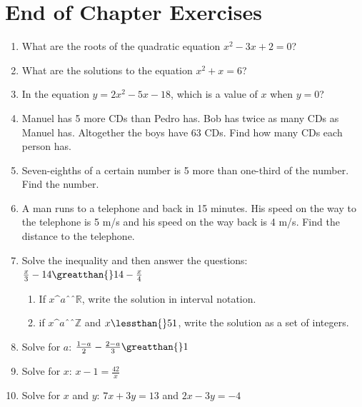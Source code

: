             \section{ End of Chapter Exercises}
            \nopagebreak
        \label{m39263*id162833}\begin{enumerate}[noitemsep, label=\textbf{\arabic*}. ] 
            \label{m39263*uid120}\item What are the roots of the quadratic equation ${x}^{2}-3x+2=0$\hspace{1ex}?
\hspace{1ex}        
\label{m39263*uid121}\item What are the solutions to the equation ${x}^{2}+x=6$\hspace{1ex}?
\hspace{1ex}        
\label{m39263*uid122}\item In the equation $y=2{x}^{2}-5x-18$, which is a value of $x$ when $y=0$\hspace{1ex}?
\hspace{1ex}        
\label{m39263*uid123}\item Manuel has 5 more CDs than Pedro has. Bob has twice as many CDs as Manuel has. Altogether the boys have 63 CDs. Find how many CDs each person has.
\hspace{1ex}        
\label{m39263*uid124}\item Seven-eighths of a certain number is 5 more than one-third of the number. Find the number.
\hspace{1ex}        
\label{m39263*uid125}\item A man runs to a telephone and back in 15 minutes. His speed on the way to the telephone is 5 m/s and his speed on the way back is 4 m/s. Find the distance to the telephone.
\hspace{1ex}        
\label{m39263*uid126}\item Solve the inequality and then answer the questions:
$\frac{x}{3}-14\greatthan{}14-\frac{x}{4}$\label{m39263*id163069}\begin{enumerate}[noitemsep, label=\textbf{\alph*}. ] 
            \label{m39263*uid127}\item If $x\^{a}ˆˆ\mathbb{R}$, write the solution in interval notation.
\label{m39263*uid128}\item if $x\^{a}ˆˆ\mathbb{Z}$ and $x\lessthan{}51$, write the solution as a set of integers.
\end{enumerate}
        \hspace{1ex}        
\label{m39263*uid129}\item Solve for $a$: $\frac{1-a}{2}-\frac{2-a}{3}\greatthan{}1$\hspace{1ex}        
\label{m39263*uid130}\item Solve for $x$: $x-1=\frac{42}{x}$\hspace{1ex}        
\label{m39263*uid131}\item Solve for $x$ and $y$: $7x+3y=13$ and $2x-3y=-4$\hspace{1ex}        
\end{enumerate}
